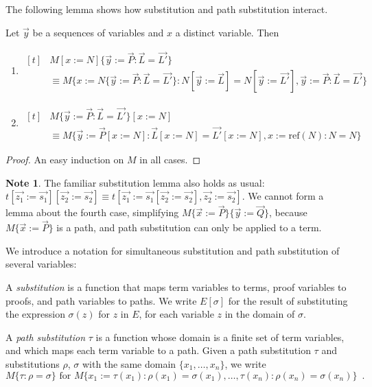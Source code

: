 \documentclass[a4paper,UKenglish]{lipics-v2016}
\newcommand*{\reff}[1]{\ensuremath{\mathrm{ref} \left( {#1} \right)}}
\theoremstyle{plain}
\theoremstyle{definition}
\newtheorem{note}[theorem]{Note}
\begin{document}
The following lemma shows how substitution and path substitution interact.

\begin{lemma}
\label{lm:subpathsub}
Let $\vec{y}$ be a sequences of variables and $x$ a distinct variable.  Then
\begin{enumerate}
\label{lm:pathsubsub}
\item
\label{lm:subpathsubi}
$ \begin{aligned}[t]
& M [ x:= N ] \{ \vec{y} := \vec{P} : \vec{L} = \vec{L'} \} \\
& \equiv M \{ x := N \{ \vec{y} := \vec{P} : \vec{L} = \vec{L'} \} : N [ \vec{y}:= \vec{L} ] = N [ \vec{y} := \vec{L'} ], \vec{y} := \vec{P} : \vec{L} = \vec{L'} \}
\end{aligned} $
\item
\label{lm:subpathsubii}
$ \begin{aligned}[t]
& M \{ \vec{y} := \vec{P} : \vec{L} = \vec{L'} \} [ x := N ] \\
& \equiv M \{ \vec{y} := \vec{P} [x := N] : \vec{L} [x := N] = \vec{L'} [x := N], x := \reff{N} : N = N \}
\end{aligned} $
\end{enumerate}
\end{lemma}

\begin{proof}
An easy induction on $M$ in all cases.
\end{proof}

\begin{note}
The familiar substitution lemma also holds as usual: $t [\vec{z_1} := \vec{s_1}] [\vec{z_2} := \vec{s_2}] \equiv t [\vec{z_1} := \vec{s_1}[\vec{z_2} := \vec{s_2}], 
\vec{z_2} := \vec{s_2}]$.  We cannot form a lemma about the fourth case, simplifying $M \{ \vec{x} := \vec{P} \} \{ \vec{y} := \vec{Q} \}$, because
$M \{ \vec{x} := \vec{P} \}$ is a path, and path substitution can only be applied to a term.
\end{note}

We introduce a notation for simultaneous substitution and path substitution of several variables:

\begin{definition}
A \emph{substitution} is a function that maps term variables to terms, proof variables to proofs, and path variables to paths.
We write $E[\sigma]$ for the result of substituting the expression $\sigma(z)$ for $z$ in $E$, for each variable $z$ in the domain of $\sigma$.

A \emph{path substitution} $\tau$ is a function whose domain is a finite set of term variables,
and which maps each term variable to a path.  Given a path substitution $\tau$ and substitutions $\rho$, $\sigma$
with the same domain $\{ x_1, \ldots, x_n \}$, we write
$$ M \{ \tau : \rho = \sigma \} \text{ for } M \{ x_1 := \tau(x_1) : \rho(x_1) = \sigma(x_1), \ldots, \tau(x_n) : \rho(x_n) = \sigma(x_n) \} \enspace . $$
\end{definition}
\end{document}
